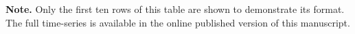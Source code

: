 \begin{table}
\begin{tabular}{ccccccccccccc}
\hline
\end{tabular}
\begin{list}{}{}
\item {\bf{Note.}}
  Only the first ten rows of this table are shown to demonstrate its format. The full time-series is available in
  the online published version of this manuscript.
\end{list}
\end{table}
